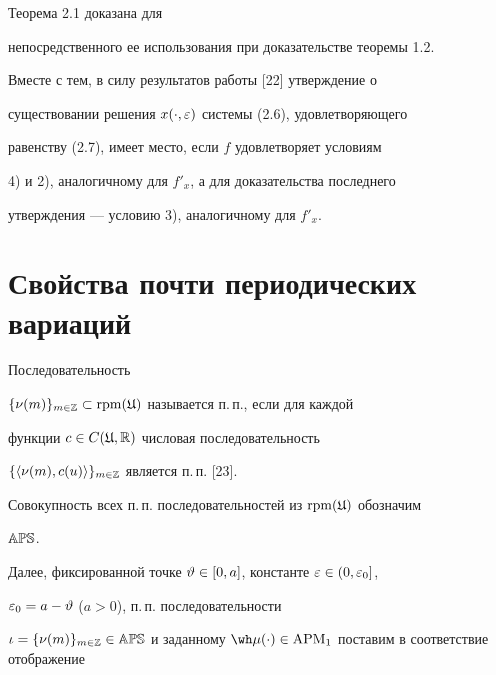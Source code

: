 \begin{notes}


Теорема 2.1 доказана для


непосредственного ее использования при доказательстве теоремы 1.2.


Вместе с тем, в силу результатов работы [22] утверждение о


существовании решения $x(\cdot,\varepsilon)$ системы (2.6), удовлетворяющего


равенству (2.7), имеет место, если $f$ удовлетворяет условиям


4) и 2), аналогичному для $f'_{x}$, а для доказательства последнего


утверждения --- условию 3), аналогичному для $f'_{x}$.


\end{notes}








\section{Свойства почти периодических вариаций}





\begin{defns}


Последовательность


$\{\nu(m)\}_{m\in\Bbb Z}\subset \operatorname{rpm}(\frak U)$ называется п.\,п., если для каждой


функции $c\in C(\frak U,\Bbb R)$ числовая последовательность


$\{\langle\nu(m),c(u)\rangle\}_{m\in\Bbb Z}$ является п.\,п. [23].


\end{defns}





Совокупность всех п.\,п. последовательностей из $\operatorname{rpm}(\frak U)$ обозначим


$\Bbb{APS}$.





Далее, фиксированной точке $\vartheta\in[0,a]$, константе $\varepsilon\in(0,\varepsilon_{0}]$,


$\varepsilon_{0}= a-\vartheta$ ($a>0$), п.\,п. последовательности


$\iota=\{\nu(m)\}_{m\in\Bbb Z}\in\Bbb{APS}$ и заданному $\wh\mu(\cdot)\in


\APM_1$ поставим в соответствие отображение


